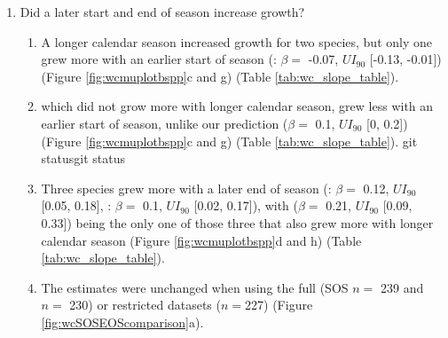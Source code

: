 \documentclass{article}\usepackage[]{graphicx}\usepackage[]{xcolor}
\begin{document}
\begin{enumerate}
\begin{enumerate}
  \item {\Ainc} grew more with longer calendar seasons ($\beta = $ 
  0.05, $UI_{90}$
  [0, 
  0.1]), but of the three species that responded to thermal season, only {\Bpap} also grew more with longer calendar seasons ($\beta = $ 
  0.18, $UI_{90}$
  [0.05, 
  0.31]).
  \item {\Ball} ($\beta = $ 
  0.03, $UI_{90}$
  [-0.03, 
  0.09]), and {\Bpop} ($\beta = $ 
  0.05, $UI_{90}$
  [-0.02, 
  0.13]) trended in the same direction (Figure \ref{fig:wcmuplotbspp}b and f) (Table \ref{tab:wc_slope_table}).
  
  \item Results with basal area increment (BAI) for the GDD model were broadly similar to ring width (see Table \ref{tab:BAItab}) 
  
  \item On a scaled axis, both predictors were similarly predictive (Figure\ref{fig:bsppZscored}). 
  \end{enumerate}
  
\item Did a later start and end of season increase growth?
  \begin{enumerate}
  \item A longer calendar season increased growth for two species, but only one grew more with an earlier start of season ({\Ainc}: $\beta = $ 
  -0.07, $UI_{90}$
  [-0.13, 
  -0.01]) (Figure \ref{fig:wcmuplotbspp}c and g) (Table \ref{tab:wc_slope_table}).
  
  \item {\Ball} which did not grow more with longer calendar season, grew less with an earlier start of season, unlike our prediction ($\beta = $ 
  0.1, $UI_{90}$
  [0, 
  0.2]) (Figure \ref{fig:wcmuplotbspp}c and g) (Table \ref{tab:wc_slope_table}).
  git statusgit status
  \item Three species grew more with a later end of season ({\Ball}: $\beta = $ 
  0.12, $UI_{90}$
  [0.05, 
  0.18], 
  {\Bpop}: $\beta = $ 
  0.1, $UI_{90}$
  [0.02, 
  0.17]), with {\Bpap} 
  ($\beta = $ 
  0.21, $UI_{90}$
  [0.09, 
  0.33])
  being the only one of those three that also grew more with longer calendar season (Figure \ref{fig:wcmuplotbspp}d and h) (Table \ref{tab:wc_slope_table}).
  
  \item The estimates were unchanged when using the full (SOS $n =$ 239 and $n =$ 230) or restricted datasets ($n=$227) (Figure \ref{fig:wcSOSEOScomparison}a). 
  

\end{enumerate}
\end{enumerate}
\end{document}

